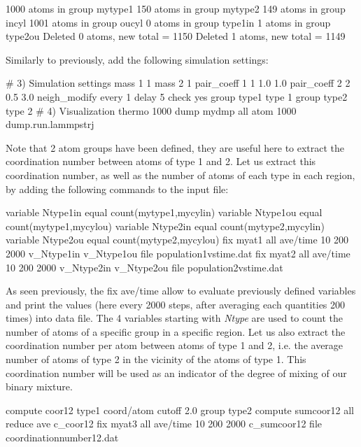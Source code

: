 \begin{lcverbatim}
1000 atoms in group mytype1
150 atoms in group mytype2
149 atoms in group incyl
1001 atoms in group oucyl
0 atoms in group type1in
1 atoms in group type2ou
Deleted 0 atoms, new total = 1150
Deleted 1 atoms, new total = 1149
\end{lcverbatim}

\noindent Similarly to previously, add the following simulation
settings:

\begin{lcverbatim}
# 3) Simulation settings
mass 1 1
mass 2 1
pair_coeff 1 1 1.0 1.0
pair_coeff 2 2 0.5 3.0
neigh_modify every 1 delay 5 check yes
group type1 type 1
group type2 type 2
# 4) Visualization
thermo 1000
dump mydmp all atom 1000 dump.run.lammpstrj
\end{lcverbatim}

\noindent Note that 2 atom groups have been defined, they are useful
here to extract the coordination number between atoms of
type 1 and 2. Let us extract this coordination number, as
well as the number of atoms of each type in each region, by
adding the following commands to the input file:

\begin{lcverbatim}
variable Ntype1in equal count(mytype1,mycylin)
variable Ntype1ou equal count(mytype1,mycylou)
variable Ntype2in equal count(mytype2,mycylin)
variable Ntype2ou equal count(mytype2,mycylou)
fix myat1 all ave/time 10 200 2000 v_Ntype1in v_Ntype1ou file population1vstime.dat
fix myat2 all ave/time 10 200 2000 v_Ntype2in v_Ntype2ou file population2vstime.dat
\end{lcverbatim}

\noindent As seen previously, the fix ave/time
allow to evaluate previously defined variables and print
the values (here every 2000 steps, after averaging each quantities 200 times)
into data file. The 4 variables starting with \textit{Ntype} are used to count
the number of atoms of a specific group in a specific
region. 
Let us also extract the coordination number per atom between atoms 
of type 1 and 2, i.e. the average number of atoms of type 2 in the vicinity 
of the atoms of type 1. This coordination number will be used as an indicator of the 
degree of mixing of our binary mixture. 

\begin{lcverbatim}
compute coor12 type1 coord/atom cutoff 2.0 group type2
compute sumcoor12 all reduce ave c_coor12
fix myat3 all ave/time 10 200 2000 c_sumcoor12 file coordinationnumber12.dat

\end{lcverbatim}


